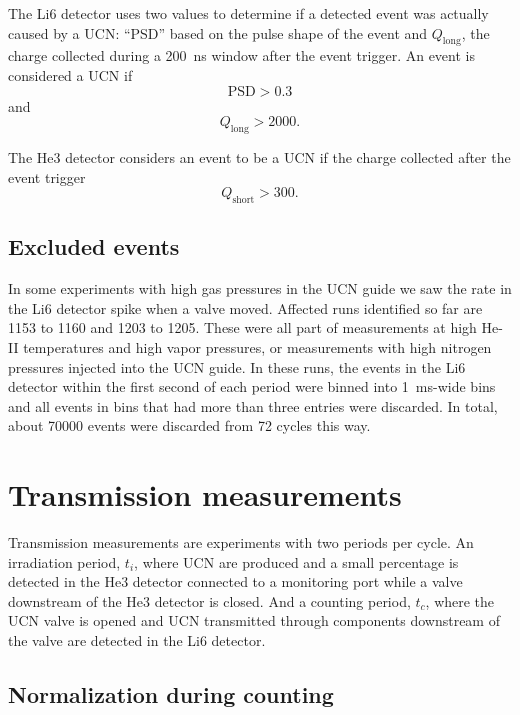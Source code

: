 \documentclass[10pt,letterpaper]{article}
\begin{document}
The Li6 detector uses two values to determine if a detected event was actually caused by a UCN: ``PSD'' based on the pulse shape of the event and $Q_\mathrm{long}$, the charge collected during a \SI{200}{\nano\second} window after the event trigger. An event is considered a UCN if
\begin{equation}
\mathrm{PSD} > 0.3
\end{equation}
and
\begin{equation}
Q_\mathrm{long} > 2000.
\end{equation}

The He3 detector considers an event to be a UCN if the charge collected after the event trigger
\begin{equation}
Q_\mathrm{short} > 300.
\end{equation}

\subsection{Excluded events}

In some experiments with high gas pressures in the UCN guide we saw the rate in the Li6 detector spike when a valve moved. Affected runs identified so far are 1153 to 1160 and 1203 to 1205. These were all part of measurements at high He-II temperatures and high vapor pressures, or measurements with high nitrogen pressures injected into the UCN guide. In these runs, the events in the Li6 detector within the first second of each period were binned into \SI{1}{\milli\second}-wide bins and all events in bins that had more than three entries were discarded. In total, about \num{70000} events were discarded from 72 cycles this way.


\section{Transmission measurements}

Transmission measurements are experiments with two periods per cycle. An irradiation period, $t_i$, where UCN are produced and a small percentage is detected in the He3 detector connected to a monitoring port while a valve downstream of the He3 detector is closed. And a counting period, $t_c$, where the UCN valve is opened and UCN transmitted through components downstream of the valve are detected in the Li6 detector.

\subsection{Normalization during counting}
\end{document}
